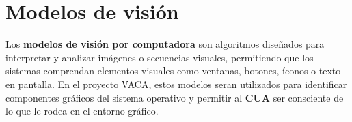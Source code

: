 \section{Modelos de visión}

Los \textbf{modelos de visión por computadora} son algoritmos diseñados para interpretar y analizar imágenes o secuencias visuales, permitiendo que los sistemas comprendan elementos visuales como ventanas, botones, íconos o texto en pantalla. En el proyecto VACA, estos modelos seran utilizados para identificar componentes gráficos del sistema operativo y permitir al \textbf{CUA} ser consciente de lo que le rodea en el entorno gráfico.


 